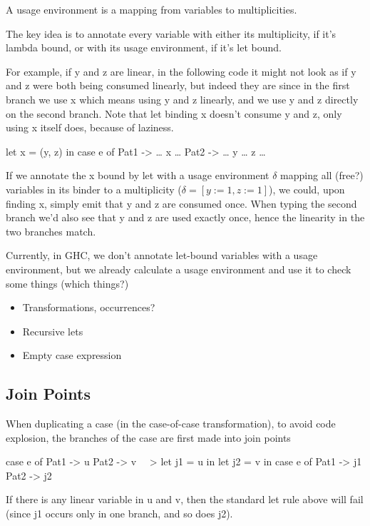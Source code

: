 \documentclass{article}
\begin{document}
A usage environment is a mapping from variables to multiplicities.

The key idea is to annotate every variable with either its multiplicity, if it's
lambda bound, or with its usage environment, if it's let bound.

For example, if y and z are linear, in the following code it might not look as
if y and z were both being consumed linearly, but indeed they are since in the
first branch we use x which means using y and z linearly, and we use y and z
directly on the second branch. Note that let binding x doesn't consume y and z,
only using x itself does, because of laziness.
\begin{code}
let x = (y, z) in
case e of
  Pat1 -> … x …
  Pat2 -> … y … z …
\end{code}

If we annotate the x bound by let with a usage environment $\delta$ mapping all (free?)
variables in its binder to a multiplicity ($\delta = [y := 1, z := 1]$), we
could, upon finding x, simply emit that y and z are consumed once. When typing
the second branch we'd also see that y and z are used exactly once, hence the
linearity in the two branches match.

Currently, in GHC, we don't annotate let-bound variables with a usage
environment, but we already calculate a usage environment and use it to check
some things (which things?)


\begin{itemize}
    \item Transformations, occurrences?
    \item Recursive lets
    \item Empty case expression
\end{itemize}

\subsection{Join Points}

When duplicating a case (in the case-of-case transformation), to avoid code
explosion, the branches of the case are first made into join points

\begin{code}
case e of
  Pat1 -> u
  Pat2 -> v
~~>
let j1 = u in
let j2 = v in
case e of
  Pat1 -> j1
  Pat2 -> j2
\end{code}

If there is any linear variable in u and v, then the standard
let rule above will fail (since j1 occurs only in one branch, and
so does j2).
\end{document}
